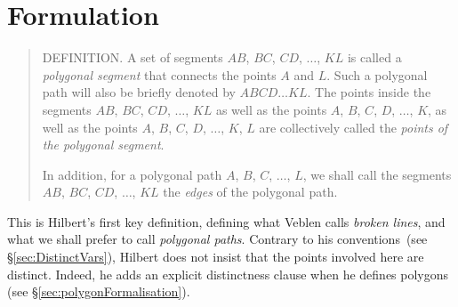 



\section{Formulation}\label{sec:JordanFormulation}
\begin{quote}
  DEFINITION. A set of segments $AB$, $BC$, $CD$, $\ldots$, $KL$ is called a \emph{polygonal segment} that connects the points $A$ and $L$. Such a polygonal path will also be briefly denoted by $ABCD\ldots KL$. The points inside the segments $AB$, $BC$, $CD$, $\ldots$, $KL$ as well as the points $A$, $B$, $C$, $D$, $\ldots$, $K$, as well as the points $A$, $B$, $C$, $D$, $\ldots$, $K$, $L$ are collectively called the \emph{points of the polygonal segment}. 

In addition, for a polygonal path $A$, $B$, $C$, $\ldots$, $L$, we shall call the segments $AB$, $BC$, $CD$, $\dots$, $KL$ the \emph{edges} of the polygonal path.

\end{quote}
This is Hilbert's first key definition, defining what Veblen calls \emph{broken lines}, and what we shall prefer to call \emph{polygonal paths}. Contrary to his conventions~(see \S\ref{sec:DistinctVars}), Hilbert does not insist that the points involved here are distinct. Indeed, he adds an explicit distinctness clause when he defines polygons (see \S\ref{sec:polygonFormalisation}).

